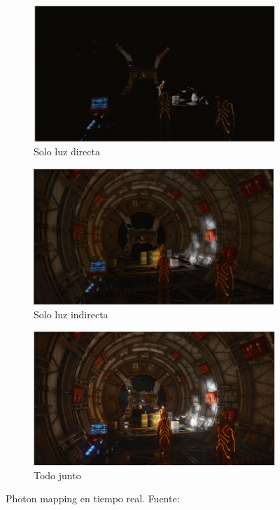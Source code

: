 \begin{figure}
    \begin{subfigure}{.5\textwidth}
        \centering
        \includegraphics[width=\textwidth]{real-time-photon-mapping-direct-only.png}
        \caption{Solo luz directa}
    \end{subfigure}
    \begin{subfigure}{.5\textwidth}
        \centering
        \includegraphics[width=\textwidth]{real-time-photon-mapping-indirect-only.png}
        \caption{Solo luz indirecta}
    \end{subfigure}
    \begin{subfigure}{\textwidth}
        \centering
        \includegraphics[width=\textwidth]{real-time-photon-mapping.png}
        \caption{Todo junto}
    \end{subfigure}
    \caption{Photon mapping en tiempo real. Fuente: \cite{real-time-photon-mapping}}
    \label{fig:real-time-photon-mapping}
\end{figure}

